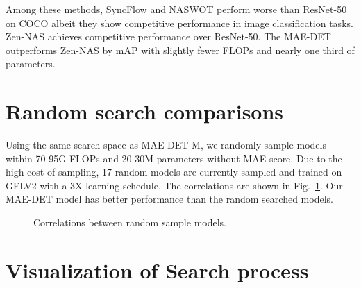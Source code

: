 \documentclass[nohyperref]{article}
\theoremstyle{plain}
\theoremstyle{definition}
\theoremstyle{remark}
\begin{document}
Among these methods, SyncFlow and NASWOT perform worse than ResNet-50 on COCO albeit they show competitive performance in image classification tasks. Zen-NAS achieves competitive performance over ResNet-50. The MAE-DET outperforms Zen-NAS by  mAP with slightly fewer FLOPs and nearly one third of parameters.


\section{Random search comparisons}\label{app:random}

Using the same search space as MAE-DET-M, we randomly sample models within 70-95G FLOPs and 20-30M parameters without MAE score. Due to the high cost of sampling, 17 random models are currently sampled and trained on GFLV2 with a 3X learning schedule. The correlations are shown in Fig.~\ref{fig:sample}. Our MAE-DET model has better performance than the random searched models.

\begin{figure}[h]
	\centering
\caption{Correlations between random sample models.}
	\label{fig:sample}	
\end{figure}
\vspace{-8pt}


\section{Visualization of Search process}\label{app:vsp}
\end{document}
